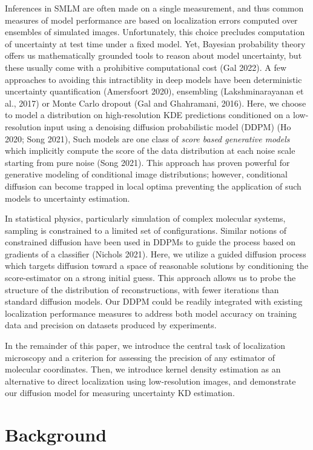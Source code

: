 \documentclass{article}
\begin{document}
Inferences in SMLM are often made on a single measurement, and thus common measures of model performance are based on localization errors computed over ensembles of simulated images. Unfortunately, this choice precludes computation of uncertainty at test time under a fixed model. Yet, Bayesian probability theory offers us mathematically grounded tools to reason about model uncertainty, but these usually come with a prohibitive computational cost (Gal 2022). A few approaches to avoiding this intractiblity in deep models have been deterministic uncertainty quantification (Amersfoort 2020), ensembling (Lakshminarayanan et al., 2017) or Monte Carlo dropout (Gal and Ghahramani, 2016). Here, we choose to model a distribution on high-resolution KDE predictions conditioned on a low-resolution input using a denoising diffusion probabilistic model (DDPM) (Ho 2020; Song 2021), Such models are one class of \emph{score based generative models} which implicitly compute the score of the data distribution at each noise scale starting from pure noise (Song 2021). This approach has proven powerful for generative modeling of conditional image distributions; however, conditional diffusion can become trapped in local optima preventing the application of such models to uncertainty estimation.

In statistical physics, particularly simulation of complex molecular systems, sampling is constrained to a limited set of configurations. Similar notions of constrained diffusion have been used in DDPMs to guide the process based on gradients of a classifier (Nichols 2021). Here, we utilize a guided diffusion process which targets diffusion toward a space of reasonable solutions by conditioning the score-estimator on a strong initial guess. This approach allows us to probe the structure of the distribution of reconstructions, with fewer iterations than standard diffusion models. Our DDPM could be readily integrated with existing localization performance measures to address both model accuracy on training data and precision on datasets produced by experiments. 

In the remainder of this paper, we introduce the central task of localization microscopy and a criterion for assessing the precision of any estimator of molecular coordinates. Then, we introduce kernel density estimation as an alternative to direct localization using low-resolution images, and demonstrate our diffusion model for measuring uncertainty KD estimation. 

\section{Background}
\end{document}

